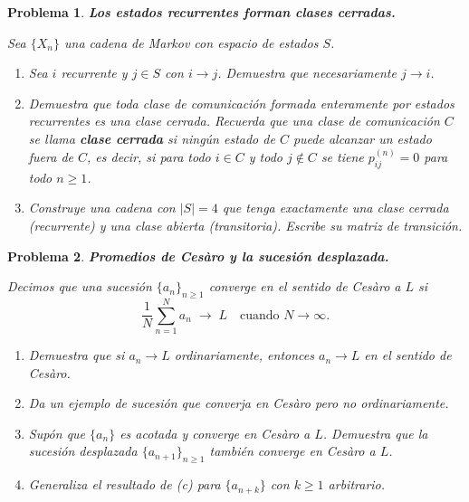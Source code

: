 \documentclass[12pt]{article}
\newtheorem{problem}{Problema}
\begin{document}
\begin{problem}
\textbf{Los estados recurrentes forman clases cerradas.}

Sea $\{X_n\}$ una cadena de Markov con espacio de estados $S$.

\begin{enumerate}
    \item[(a)] Sea $i$ recurrente y $j \in S$ con $i \to j$. Demuestra que necesariamente $j \to i$.

    \item[(b)] Demuestra que toda clase de comunicación formada enteramente por estados recurrentes es una clase cerrada. Recuerda que una clase de comunicación $C$ se llama \textbf{clase cerrada} si ningún estado de $C$ puede alcanzar un estado fuera de $C$, es decir, si para todo $i \in C$ y todo $j \notin C$ se tiene $p_{ij}^{(n)} = 0$ para todo $n \ge 1$.

    \item[(c)] Construye una cadena con $|S| = 4$ que tenga exactamente una clase cerrada (recurrente) y una clase abierta (transitoria). Escribe su matriz de transición.
\end{enumerate}
\end{problem}

\begin{problem}
\textbf{Promedios de Cesàro y la sucesión desplazada.}

Decimos que una sucesión $\{a_n\}_{n \ge 1}$ \emph{converge en el sentido de Cesàro} a $L$ si
\[
    \frac{1}{N} \sum_{n=1}^{N} a_n \;\longrightarrow\; L \quad \text{cuando } N \to \infty.
\]

\begin{enumerate}
    \item[(a)] Demuestra que si $a_n \to L$ ordinariamente, entonces $a_n \to L$ en el sentido de Cesàro.

    \item[(b)] Da un ejemplo de sucesión que converja en Cesàro pero no ordinariamente.

    \item[(c)] Supón que $\{a_n\}$ es acotada y converge en Cesàro a $L$. Demuestra que la sucesión desplazada $\{a_{n+1}\}_{n \ge 1}$ también converge en Cesàro a $L$.

    \item[(d)] Generaliza el resultado de (c) para $\{a_{n+k}\}$ con $k \ge 1$ arbitrario.
\end{enumerate}
\end{problem}
\end{document}

